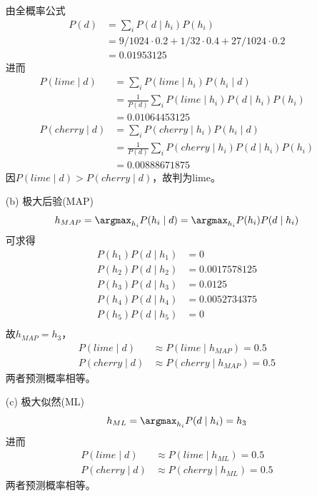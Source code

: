 \documentclass[a4paper, 11pt]{article}
\begin{document}
\begin{answer}
\begin{itemize}
    由全概率公式
    \[\begin{aligned}
        P(d)&=\sum_i P(d\mid h_i)P(h_i)\\
        &=9/1024\cdot 0.2 + 1/32\cdot 0.4 + 27/1024\cdot 0.2\\
        &=0.01953125
    \end{aligned}\]
    进而
    \[\begin{aligned}
        P(lime \mid d)&=\sum_{i}P(lime\mid h_i)P(h_i\mid d)\\
        &=\frac{1}{P(d)}\sum_iP(lime\mid h_i)P(d\mid h_i)P(h_i)\\
        &=0.01064453125\\
        P(cherry \mid d)&=\sum_{i}P(cherry\mid h_i)P(h_i\mid d)\\
        &=\frac{1}{P(d)}\sum_iP(cherry\mid h_i)P(d\mid h_i)P(h_i)\\
        &=0.00888671875
    \end{aligned}\]
    因$P(lime \mid d)>P(cherry \mid d)$，故判为lime。
    \item [(b)] 极大后验(MAP)
    \[h_{MAP}=\argmax_{h_i} P(h_i\mid d)=\argmax_{h_i} P(h_i)P(d\mid h_i)\]
    可求得
    \[\begin{aligned}
        P(h_1)P(d\mid h_1) &= 0\\
        P(h_2)P(d\mid h_2) &= 0.0017578125\\
        P(h_3)P(d\mid h_3) &= 0.0125\\
        P(h_4)P(d\mid h_4) &= 0.0052734375\\
        P(h_5)P(d\mid h_5) &= 0\\
    \end{aligned}\]
    故$h_{MAP}=h_3$，
    \[\begin{aligned}
        P(lime\mid d)&\approx P(lime\mid h_{MAP})=0.5\\
        P(cherry\mid d)&\approx P(cherry\mid h_{MAP})=0.5
    \end{aligned}\]
    两者预测概率相等。
    \item [(c)] 极大似然(ML)
    \[h_{ML}=\argmax_{h_i} P(d\mid h_i)=h_3\]
    进而
    \[\begin{aligned}
        P(lime\mid d)&\approx P(lime\mid h_{ML})=0.5\\
        P(cherry\mid d)&\approx P(cherry\mid h_{ML})=0.5
    \end{aligned}\]
    两者预测概率相等。
\end{itemize}
\end{answer}
\begin{flushleft}
\end{flushleft}
\end{document}
